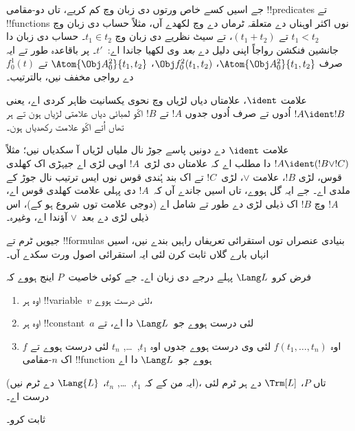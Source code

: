 \documentclass[../../../include/open-logic-section]{subfiles}
\begin{document}
جے اسیں کسے خاص ورتوں دی زبان وچ کم کریے، تاں دو-مقامی
!!{predicate}s تے !!{function}s نوں اکثر اوہناں دے متعلقہ
ٹرماں دے وچ لکھدے آں، مثلاً حساب دی زبان وچ $t_1 < t_2$
تے $(t_1 + t_2)$، تے سیٹ نظریے دی زبان وچ $t_1 \in t_2$۔
حساب دی زبان دا جانشین فنکشن رواجاً اپنی دلیل دے
\emph{بعد} وی لکھیا جاندا اے:~$t'$۔ پر باقاعدہ طور تے
ایہ صرف $\Atom{\Obj A^2_0}{t_1, t_2}$،
$\Obj f^2_0(t_1, t_2)$، $\Atom{\Obj A^2_0}{t_1, t_2}$
تے $f^1_0(t)$ دے رواجی مخفف نیں، بالترتیب۔

\begin{defn}
علامت $\ident$، علامتاں دیاں لڑیاں وچ نحوی یکسانیت
ظاہر کردی اے، یعنی $!A \ident !B$ اُدوں تے صرف
اُدوں جدوں $!A$ تے $!B$ اکّو لمبائی دیاں علامتی
لڑیاں ہون تے ہر تھاں اُتے اکّو علامت رکھدیاں ہون۔
\end{defn}

علامت $\ident$ دے دونیں پاسے جوڑ نال ملیاں لڑیاں
آ سکدیاں نیں؛ مثلاً $!A \ident (!B \lor !C)$ دا
مطلب اے کہ علامتاں دی لڑی~$!A$ اوہی لڑی اے
جیہڑی اک کھلدی قوس، لڑی $!B$، علامت $\lor$،
لڑی~$!C$ تے اک بند ہُندی قوس نوں ایس ترتیب نال
جوڑ کے ملدی اے۔ جے ایہ گل ہووے، تاں اسیں جاندے
آں کہ~$!A$ دی پہلی علامت کھلدی قوس اے، $!A$
وچ $!B$ اک ذیلی لڑی دے طور تے شامل اے (دوجی
علامت توں شروع ہو کے)، اس ذیلی لڑی دے بعد~$\lor$
آؤندا اے، وغیرہ۔

جیویں ٹرم تے !!{formula}s بنیادی عنصراں توں
استقرائی تعریفاں راہیں بندے نیں، اسیں انہاں بارے
گلاں ثابت کرن لئی ایہ استقرائی اصول ورت سکدے آں۔

\begin{lem}
    فرض کرو $\Lang L$ پہلے درجے دی زبان اے۔
    جے کوئی خاصیت~$P$ اینج ہووے کہ
    \begin{enumerate}
        \item اوہ ہر !!{variable}~$v$ لئی درست ہووے،
        \item اوہ ہر !!{constant}~$a$ لئی درست ہووے جو~$\Lang L$ دا اے، تے
        \item اوہ $f(t_1,\dotsc,t_n)$ لئی وی درست ہووے جدوں
            اوہ $t_1$,~\dots, $t_n$ لئی درست ہووے تے $f$
            اک $n$-مقامی !!{function} ہووے جو~$\Lang L$ دا اے
    \end{enumerate}
    (ایہ من کے کہ $t_1$,~\dots, $t_n$، $\Lang{L}$ دے ٹرم نیں)،
    تاں $P$، $\Trm[L]$ دے ہر ٹرم لئی درست اے۔
\end{lem}

\begin{prob}
     ثابت کرو۔
\end{prob}
\end{document}
